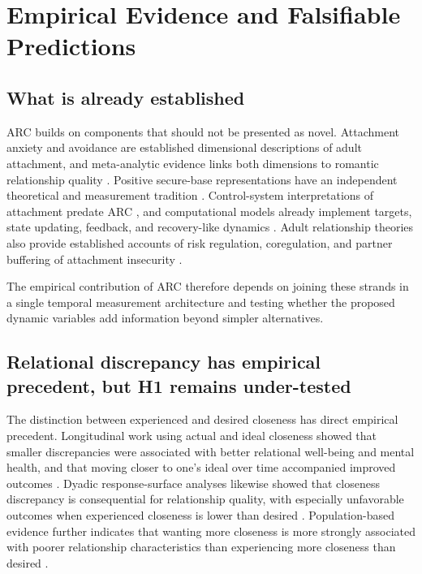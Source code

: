 \section{Empirical Evidence and Falsifiable Predictions}

\subsection{What is already established}

ARC builds on components that should not be presented as novel. Attachment anxiety and avoidance are established dimensional descriptions of adult attachment, and meta-analytic evidence links both dimensions to romantic relationship quality \parencite{fraley2000irt,mikulincer2016attachment,li2012meta}. Positive secure-base representations have an independent theoretical and measurement tradition \parencite{waters2006workingmodels,waters2019securebase,waters2025securebase}. Control-system interpretations of attachment predate ARC \parencite{bowlby1982attachment,kobak1993control,petters2019control}, and computational models already implement targets, state updating, feedback, and recovery-like dynamics \parencite{stevens2009dynamic,gagliardi2022control,olar2026relationship}. Adult relationship theories also provide established accounts of risk regulation, coregulation, and partner buffering of attachment insecurity \parencite{murray2006risk,sbarra2008coregulation,simpson2014buffering,overall2022buffering}.

The empirical contribution of ARC therefore depends on joining these strands in a single temporal measurement architecture and testing whether the proposed dynamic variables add information beyond simpler alternatives.

\subsection{Relational discrepancy has empirical precedent, but H1 remains under-tested}

The distinction between experienced and desired closeness has direct empirical precedent. Longitudinal work using actual and ideal closeness showed that smaller discrepancies were associated with better relational well-being and mental health, and that moving closer to one's ideal over time accompanied improved outcomes \parencite{frost2013closeness}. Dyadic response-surface analyses likewise showed that closeness discrepancy is consequential for relationship quality, with especially unfavorable outcomes when experienced closeness is lower than desired \parencite{pusch2022closeness}. Population-based evidence further indicates that wanting more closeness is more strongly associated with poorer relationship characteristics than experiencing more closeness than desired \parencite{pietras2024closeness}.

